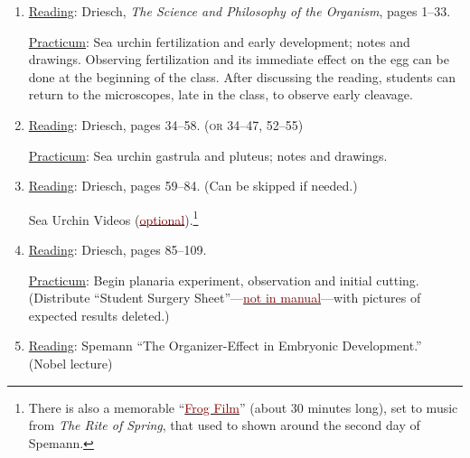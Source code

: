 \documentclass{article}
\newcommand{\rd}{\uline{Reading}}
\newcommand{\pc}{\uline{Practicum}}
\begin{document}
\begin{enumerate}
	\pc: Cell observation continued, unicellular organisms. \textsc{and/or} 
	 
	\pc: Observation of volvox algae.
	
\item \rd: Driesch, \emph{The Science and Philosophy of the Organism}, pages 1--33.

	\pc: Sea urchin fertilization and early development; notes and drawings. Observing fertilization and
	its immediate effect on the egg can be done at the beginning of the class. After discussing the reading, students can return to the microscopes, late in the class, to observe early cleavage.
	\item \rd: Driesch, pages 34--58. (\textsc{or} 34--47, 52--55)

	\pc: Sea urchin gastrula and pluteus; notes and drawings.
\item \rd: Driesch, pages 59--84. (Can be skipped if needed.)

Sea Urchin Videos (\href{https://sjca.sharepoint.com/sites/SJCLab/SitePages/Sea-Urchin-Videos.aspx?csf=1&web=1&e=TMKe6l&CID=2e377289-0a6e-4f86-9e8e-49db30a84b8e}{\textcolor{Maroon}{optional}}).\footnote{There is also a memorable ``\href{https://sjca.sharepoint.com/sites/SJCLab/_layouts/15/stream.aspx?id=\%2Fsites\%2FSJCLab\%2FShared\%20Documents\%2FFRESHMAN\%20LAB\%2FFR1\%2DObserving\%20Living\%20Beings\%2FPracticums\%2F23\%20\%2D\%20Frog\%2FThe\%20Frog\%2Em4v&referrer=StreamWebApp\%2EWeb&referrerScenario=AddressBarCopied\%2Eview\%2Ee3305199\%2D3d78\%2D4523\%2Db488\%2D99c2625c582c}{\textcolor{Maroon}{Frog Film}}'' (about 30 minutes long), set to music from \emph{The Rite of Spring}, that used to shown around the second day of Spemann.}   %
 
\item \rd: Driesch, pages 85--109.

	\pc: Begin planaria
	experiment, observation and initial cutting. (Distribute ``Student Surgery Sheet''---\href{https://sjca.sharepoint.com/:b:/r/sites/Departments/Faculty/Documents/Annapolis/Freshman\%20Lab/Schedule\%20and\%20files/Student_surgery_sheet.pdf?csf=1&web=1&e=n1myod}{\textcolor{Maroon}{not in manual}}---with pictures of expected results deleted.) %
	\item \rd: Spemann ``The Organizer-Effect in Embryonic Development.'' (Nobel lecture)
	

\end{enumerate}
\end{document}

